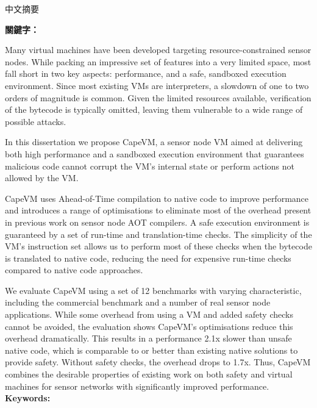 \begin{abstractzh}
中文摘要

\bigbreak
\noindent \textbf{關鍵字：}{\, \makeatletter \@keywordszh \makeatother}
\end{abstractzh}

\begin{abstracten}
Many virtual machines have been developed targeting resource-constrained sensor nodes. While packing an impressive set of features into a very limited space, most fall short in two key aspects: performance, and a safe, sandboxed execution environment. Since most existing VMs are interpreters, a slowdown of one to two orders of magnitude is common. Given the limited resources available, verification of the bytecode is typically omitted, leaving them vulnerable to a wide range of possible attacks.

In this dissertation we propose CapeVM, a sensor node VM aimed at delivering both high performance and a sandboxed execution environment that guarantees malicious code cannot corrupt the VM's internal state or perform actions not allowed by the VM.

CapeVM uses Ahead-of-Time compilation to native code to improve performance and introduces a range of optimisations to eliminate most of the overhead present in previous work on sensor node AOT compilers. A safe execution environment is guaranteed by a set of run-time and translation-time checks. The simplicity of the VM's instruction set allows us to perform most of these checks when the bytecode is translated to native code, reducing the need for expensive run-time checks compared to native code approaches.

We evaluate CapeVM using a set of 12 benchmarks with varying characteristic, including the commercial  benchmark and a number of real sensor node applications. While some overhead from using a VM and added safety checks cannot be avoided, the evaluation shows CapeVM's optimisations reduce this overhead dramatically. This results in a performance 2.1x slower than unsafe native code, which is comparable to or better than existing native solutions to provide safety. Without safety checks, the overhead drops to 1.7x. Thus, CapeVM combines the desirable properties of existing work on both safety and virtual machines for sensor networks with significantly improved performance.
\bigbreak
\noindent \textbf{Keywords: }{\, \makeatletter \@keywordsen \makeatother}
\end{abstracten}

\begin{comment}


\end{comment}
